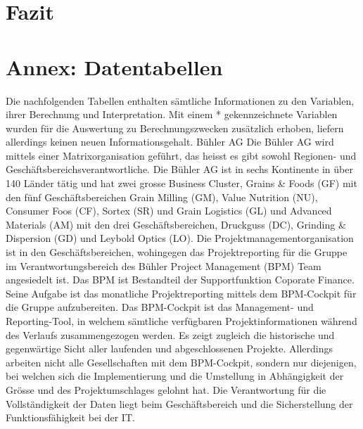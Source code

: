 
\section{Fazit}\label{sec:fazit}
\section*{Annex: Datentabellen}\label{sec:annex}
Die nachfolgenden Tabellen enthalten sämtliche Informationen zu den Variablen, ihrer Berechnung und Interpretation. Mit einem * gekennzeichnete Variablen wurden für die Auswertung zu Berechnungszwecken zusätzlich erhoben, liefern allerdings keinen neuen Informationsgehalt. 
Bühler AG
 Die Bühler AG wird mittels einer Matrixorganisation geführt, das heisst es gibt sowohl Regionen- und Geschäftsbereichsverantwortliche. Die Bühler AG ist in sechs Kontinente in über 140 Länder tätig und hat zwei grosse Business Cluster, Grains \& Foods (GF) mit den fünf Geschäftsbereichen Grain Milling (GM), Value Nutrition (NU), Consumer Foos (CF), Sortex (SR) und Grain Logistics (GL) und Advanced Materials (AM) mit den drei Geschäftsbereichen, Druckguss (DC), Grinding \& Dispersion (GD) und Leybold Optics (LO). Die Projektmanagementorganisation ist in den Geschäftsbereichen, wohingegen das Projektreporting für die Gruppe im Verantwortungsbereich des Bühler Project Management (BPM) Team angesiedelt ist. Das BPM ist Bestandteil der Supportfunktion Coporate Finance. Seine Aufgabe ist das monatliche Projektreporting mittels dem BPM-Cockpit für die Gruppe aufzubereiten. Das BPM-Cockpit ist das Management- und Reporting-Tool, in welchem sämtliche verfügbaren Projektinformationen während des Verlaufs zusammengezogen werden. Es zeigt zugleich die historische und gegenwärtige Sicht aller laufenden und abgeschlossenen Projekte. Allerdings arbeiten nicht alle Gesellschaften mit dem BPM-Cockpit, sondern nur diejenigen, bei welchen sich die Implementierung und die Umstellung in Abhängigkeit der Grösse und des Projektumschlages gelohnt hat. Die Verantwortung für die Vollständigkeit der Daten liegt beim Geschäftsbereich und die Sicherstellung der Funktionsfähigkeit bei der IT.
